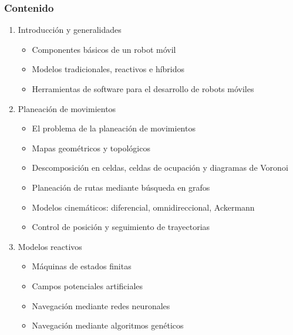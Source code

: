\begin{frame}\frametitle{Contenido}
  \begin{enumerate}
  \item Introducción y generalidades
    \begin{itemize}
    \item Componentes básicos de un robot móvil
    \item Modelos tradicionales, reactivos e híbridos
    \item Herramientas de software para el desarrollo de robots móviles
    \end{itemize}
  \item Planeación de movimientos
    \begin{itemize}
    \item El problema de la planeación de movimientos
    \item Mapas geométricos y topológicos
    \item Descomposición en celdas, celdas de ocupación y diagramas de Voronoi
    \item Planeación de rutas mediante búsqueda en grafos
    \item Modelos cinemáticos: diferencial, omnidireccional, Ackermann
    \item Control de posición y seguimiento de trayectorias
    \end{itemize}
  \item Modelos reactivos
    \begin{itemize}
    \item Máquinas de estados finitas
    \item Campos potenciales artificiales
    \item Navegación mediante redes neuronales
    \item Navegación mediante algoritmos genéticos
    \end{itemize}
  \end{enumerate}
\end{frame}

